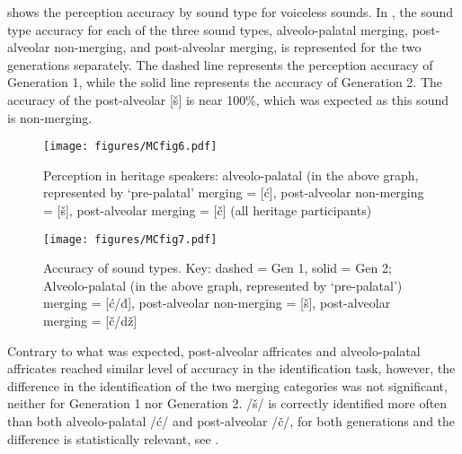 \documentclass[output=paper,modfonts,newtxmath,hidelinks,]{langscibook}
\begin{document}
 shows the perception accuracy by sound type for voiceless sounds. In , the sound type accuracy for each of the three sound types, alveolo-palatal merging, post-alveolar non-merging, and post-alveolar merging, is represented for the two generations separately. The dashed line represents the perception accuracy of Generation 1, while the solid line represents the accuracy of Generation 2. The accuracy of the post-alveolar [š] is near 100\%, which was expected as this sound is non-merging.

\begin{figure}
\texttt{[image: figures/MCfig6.pdf]}
\caption{\label{fig:mihajlovic:6} Perception in heritage speakers: alveolo-palatal (in the above graph, represented by ‘pre-palatal’ merging = [ć], post-alveolar non-merging = [š], post-alveolar merging = [č] (all heritage participants)}
\end{figure}

\begin{figure}
\texttt{[image: figures/MCfig7.pdf]}
\caption{\label{fig:mihajlovic:7} Accuracy of sound types. Key: dashed = Gen 1, solid = Gen 2; Alveolo-palatal (in the above graph, represented by ‘pre-palatal’) merging = [ć/đ], post-alveolar non-merging = [š], post-alveolar merging = [č/dž]}
\end{figure}

Contrary to what was expected, post-alveolar affricates and alveolo-palatal affricates reached similar level of accuracy in the identification task, however, the difference in the identification of the two merging categories was not significant, neither for Generation 1 nor Generation 2. /š/ is correctly identified more often than both alveolo-palatal /ć/ and post-alveolar /č/, for both generations and the difference is statistically relevant, see .
\end{document}
